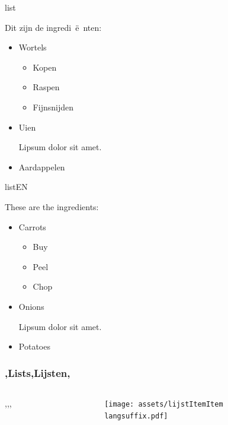     \begin{saveblock}{list}
        \begin{highlightblock}[linewidth=0.5\textwidth,gobble=8]
            Dit zijn de ingredi~\"e~nten:
            \begin{itemize}
                \item Wortels
                \begin{itemize}
                    \item Kopen
                    \item Raspen
                    \item Fijnsnijden
                \end{itemize}			
                \item Uien
                
                Lipsum dolor sit amet.
                \item Aardappelen
            \end{itemize}
        \end{highlightblock}
    \end{saveblock}

    \begin{saveblock}{listEN}
        \begin{highlightblock}[linewidth=0.5\textwidth,gobble=8]
            These are the ingredients:
            \begin{itemize}
                \item Carrots
                \begin{itemize}
                    \item Buy
                    \item Peel
                    \item Chop
                \end{itemize}
                \item Onions
                
                Lipsum dolor sit amet.
                \item Potatoes
            \end{itemize}
        \end{highlightblock}
    \end{saveblock}

    \begin{frame}
        \frametitle{\lang,Lists,Lijsten,}
        
        \begin{columns}
            \begin{column}{0.5\textwidth}
                \lang,,,
            \end{column}
            \begin{column}{0.5\textwidth}
                \texttt{[image: assets/lijstItemItem\\langsuffix.pdf]}
            \end{column}
        \end{columns}
    \end{frame}
    
\endDetail
